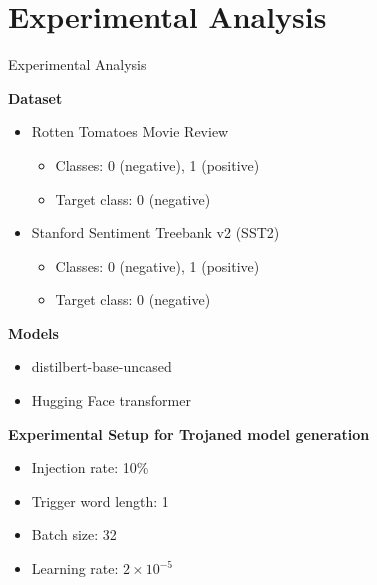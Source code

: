 \section{Experimental Analysis}
\begin{frame}[allowframebreaks]{Experimental Analysis}

\textbf{Dataset}
\begin{itemize}
    \item Rotten Tomatoes Movie Review \cite{rottentomatoPang+Lee:05a}
    \begin{itemize}
        \item Classes: 0 (negative), 1 (positive)
        \item Target class: 0 (negative)
    \end{itemize}
    \item Stanford Sentiment Treebank v2 (SST2) \cite{sst2-socher-etal-2013-recursive}
    \begin{itemize}
        \item Classes: 0 (negative), 1 (positive)
        \item Target class: 0 (negative)
    \end{itemize}
\end{itemize}

\framebreak

\textbf{Models}
\begin{itemize}
    \item distilbert-base-uncased \cite{sanh2019distilbert}
    \item Hugging Face transformer
\end{itemize}

\framebreak

\textbf{Experimental Setup for Trojaned model generation}
\begin{itemize}
    \item Injection rate: 10\%
    \item Trigger word length: 1
    \item Batch size: 32
    \item Learning rate: $ 2\times {10}^{-5} $
\end{itemize}


\end{frame}
